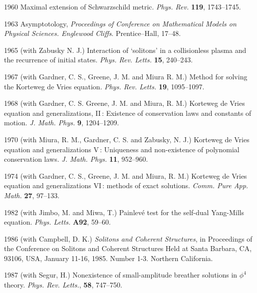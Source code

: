 \documentclass[11pt]{article}
\begin{document}
\item[1960] Maximal extension of Schwarzschild metric. \textit{Phys. Rev.} \textbf{119}, 1743--1745.

\item[1963] Asymptotology, %
\textit{Proceedings of Conference on Mathematical Models on Physical Sciences. Englewood Cliffs}. Prentice--Hall, 17--48.

\item[1965] (with Zabusky N. J.) Interaction of `solitons' in a collisionless plasma and the recurrence
of initial states. \textit{Phys. Rev. Letts.} \textbf{15}, 240--243. 

\item[1967] (with Gardner, C. S., Greene, J. M. and Miura R. M.) Method for solving the Korteweg de Vries equation. 
\textit{Phys. Rev. Letts.} \textbf{19}, 1095--1097. 

\item[1968] (with Gardner, C. S. Greene, J. M. and Miura, R. M.)  Korteweg de Vries equation and generalizations, II\,: 
Existence of conservation laws and constants of motion. \textit{J. Math. Phys.} \textbf{9}, 1204--1209. 

\item[1970] (with Miura, R. M., Gardner, C. S. and Zabusky, N. J.) Korteweg de Vries equation and generalizations 
V\,: Uniqueness and non-existence of polynomial conservation laws. \textit{J. Math. Phys.} \textbf{11}, 952--960. 

\item[1974] (with Gardner, C. S., Greene, J. M. and Miura, R. M.) Korteweg de Vries equation and generalizations 
VI\,: methods of exact solutions. \textit{Comm. Pure App. Math.} \textbf{27}, 97--133. 

\item[1982] (with Jimbo, M. and Miwa, T.) Painlev\'e test for the self-dual Yang-Mills equation. \textit{Phys. Letts.} 
\textbf{A92}, 59--60.

\item[1986] (with Campbell, D. K.) \textit{Solitons and Coherent Structures}, in Proceedings of the Conference on Solitons 
and Coherent Structures Held at Santa Barbara, CA, 93106, USA, January 11-16, 1985. Number 1-3. Northern California.

\item[1987] (with Segur, H.) Nonexistence of small-amplitude breather solutions in $\phi^4$ theory.  \textit{Phys. Rev. 
Letts.}, \textbf{58}, 747--750.
\end{document}
